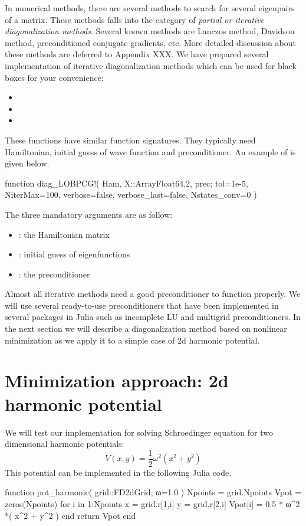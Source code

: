 In numerical methods, there are several methods to search for several eigenpairs
of a matrix. These methods falls into the category of \textit{partial or iterative
diagonalization methods}. Several known methods are Lanczos method, Davidson method,
preconditioned conjugate gradients, etc.
More detailed discussion about these methods are deferred to Appendix XXX.
We have prepared several implementation of iterative diagonalization methods
which can be used for black boxes for your convenience:
%
\begin{itemize}
\item {}
\item {}
\item {}
\end{itemize}
%
These functions have similar function signatures. They typically
need Hamiltonian, initial guess of wave function and preconditioner.
An example of  is given below.
%
\begin{juliacode}
function diag_LOBPCG!( Ham, X::Array{Float64,2}, prec;
                       tol=1e-5, NiterMax=100, verbose=false,
                       verbose_last=false, Nstates_conv=0 )
\end{juliacode}
%
The three mandatory arguments are as follow:
%
\begin{itemize}
\item {}: the Hamiltonian matrix
\item {}: initial guess of eigenfunctions
\item {}: the preconditioner
\end{itemize}

Almost all iterative methods need a good preconditioner to function properly.
We will use several ready-to-use preconditioners that have been implemented
in several packages in Julia such as incomplete LU and multigrid preconditioners.
In the next section we will describe a diagonalization method based
on nonlinear minimization as we apply it to a simple case of 2d harmonic
potential.


\section{Minimization approach: 2d harmonic potential}

We will test our implementation for solving Schroedinger equation for two
dimensional harmonic potentials:
%
\begin{equation}
V(x,y) = \frac{1}{2} \omega^2 (x^2 + y^2)
\end{equation}
%
This potential can be implemented in the following Julia code.
%
\begin{juliacode}
function pot_harmonic( grid::FD2dGrid; ω=1.0 )
  Npoints = grid.Npoints
  Vpot = zeros(Npoints)
  for i in 1:Npoints
    x = grid.r[1,i]
    y = grid.r[2,i]
    Vpot[i] = 0.5 * ω^2 *( x^2 + y^2 )
  end
  return Vpot
end
\end{juliacode}

